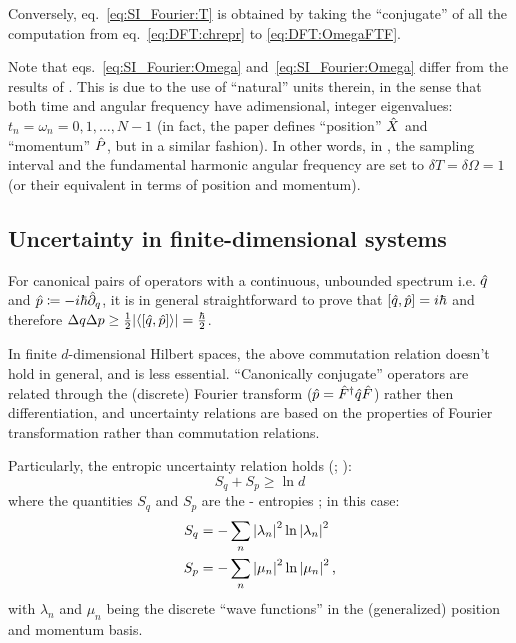 Conversely, eq.~\eqref{eq:SI_Fourier:T} is obtained by
taking the ``conjugate'' of all the computation
from eq.~\eqref{eq:DFT:chrepr} to \eqref{eq:DFT:OmegaFTF}.

Note that eqs.~\eqref{eq:SI_Fourier:Omega} and~\eqref{eq:SI_Fourier:Omega}
differ from the results of \cite{FiniteHilb}.
This is due to the use of
``natural'' units therein,
in the sense that
both time and angular frequency
have adimensional, integer eigenvalues:
$t_n = \omega_n = 0, 1, \dots, N-1$
(in fact, the paper defines ``position'' $\hat{X}$ and ``momentum'' $\hat{P}$,
but in a similar fashion).
In other words, in \citereset\cite{FiniteHilb}, the sampling interval and the fundamental harmonic angular frequency
are set to $\delta{T} = \delta{\Omega} = 1$ (or their equivalent in terms of position and momentum).

\subsection{Uncertainty in finite-dimensional systems}\label{sec:finite_uncertainty}
\citereset
For canonical pairs of operators with a continuous, unbounded spectrum i.e.
$\hat{q}$ and $\hat{p} \coloneqq -i\hbar\hat{\partial}_{q}$,
it is in general straightforward to prove that
$\qty[\hat{q}, \hat{p}] = i\hbar$ and therefore
$\Delta q \Delta p \geq {\frac{1}{2} \qty|\ev{\qty[\op{q}, \op{p}]}| = \frac{\hbar}{2}}$.

In finite $d$-dimensional Hilbert spaces, the above commutation relation doesn't hold
in general, and is less essential.
``Canonically conjugate'' operators are related
through the (discrete) Fourier transform ($\hat{p} = \hat{F}^{\dagger}\hat{q}\hat{F}$)
rather then differentiation,
and uncertainty relations are based on
the properties of Fourier transformation
rather than commutation relations.

Particularly, the entropic uncertainty relation holds
(\cite[]{FiniteHilb}; \cite{Deutsch:Uncertainty}):
\begin{equation}
  S_q + S_p \geq \ln d
\end{equation}
where the quantities $S_q$ and $S_p$ are the - entropies
\parencite[.A]{Wehner:Uncertainty}; in this case:
\begin{align}
  S_q &= -\sum_n \qty|\lambda_n |^2  \ln\qty|\lambda_n|^2 \\
  S_p &= -\sum_n \qty|\mu_n     |^2  \ln\qty|\mu_n    |^2
  \,\text{,}
\end{align}
with $\lambda_n$ and $\mu_n$ being the discrete ``wave functions'' in the
(generalized) position and momentum basis.
